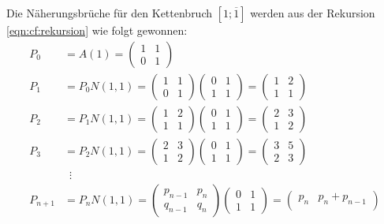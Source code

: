 \begin{beispiel}
Die Näherungsbrüche für den Kettenbruch $[1;\overline{1}]$ 
werden aus der Rekursion \eqref{eqn:cf:rekursion} wie folgt gewonnen:
\begin{align*}
P_0&=A(1) = \begin{pmatrix} 1&1\\0&1\end{pmatrix}
\\
P_1&=P_0N(1,1)
=
\begin{pmatrix}1&1\\0&1\end{pmatrix}
\begin{pmatrix}0&1\\1&1\end{pmatrix}
=
\begin{pmatrix}
1&2\\
1&1
\end{pmatrix}
\\
P_2&=P_1N(1,1)
=
\begin{pmatrix}
1&2\\
1&1
\end{pmatrix}
\begin{pmatrix}0&1\\1&1\end{pmatrix}
=
\begin{pmatrix}
2&3\\
1&2
\end{pmatrix}
\\
P_3&=P_2N(1,1)
=
\begin{pmatrix}
2&3\\
1&2
\end{pmatrix}
\begin{pmatrix}
0&1\\
1&1
\end{pmatrix}
=
\begin{pmatrix}
3&5\\
2&3
\end{pmatrix}
\\
&\phantom{0}\vdots
\\
P_{n+1}
&=
P_nN(1,1)
=
\begin{pmatrix}
p_{n-1}&p_n\\
q_{n-1}&q_n
\end{pmatrix}
\begin{pmatrix}
0&1\\
1&1
\end{pmatrix}
=
\begin{pmatrix}
p_n&p_n+p_{n-1}\\

\end{pmatrix}
\end{align*}
\end{beispiel}
